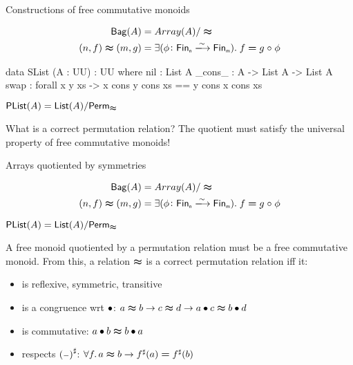 \documentclass[9pt]{beamer}
\begin{document}
\begin{frame}[fragile]{Constructions of free commutative monoids}
    \begin{dblock}
        \vspace{-0.4cm}
        \begin{align*}
            \type{Bag}(A) &= Array(A) / \reln
            \\
            (n,f) \reln (m,g) &= 
                \exis{\phi\colon \Fin[n]\xto{\sim}\Fin[m]}{f \id g \comp \phi}
        \end{align*}
    \end{dblock}
    \begin{dblock}
        \begin{code}
data SList (A : UU) : UU where
  nil : List A
  _cons_ : A -> List A -> List A
  swap : forall x y xs -> x cons y cons xs == y cons x cons xs 
        \end{code}
    \end{dblock}
    \begin{dblock}
        $\mathsf{PList}(A) = \mathsf{List}(A) / \mathsf{Perm}_{\mathrel{\boldsymbol{\approx}}}$
    \end{dblock}
    What is a correct permutation relation? The quotient must satisfy the universal property of free commutative monoids!  
\end{frame}

\begin{frame}[fragile]{Arrays quotiented by symmetries}
    \begin{dblock}
        \vspace{-0.4cm}
        \begin{align*}
            \type{Bag}(A) &= Array(A) / \reln
            \\
            (n,f) \reln (m,g) &= 
                \exis{\phi\colon \Fin[n]\xto{\sim}\Fin[m]}{f \id g \comp \phi}
        \end{align*}
    \end{dblock}
    \begin{dblock}
        $\mathsf{PList}(A) = \mathsf{List}(A) / \mathsf{Perm}_{\mathrel{\boldsymbol{\approx}}}$
    \end{dblock}

    A free monoid quotiented by a \alert{permutation relation} must be a free commutative monoid. From this, a relation $\mathrel{\boldsymbol{\approx}}$ is a correct permutation relation iff it:
    \begin{itemize}
        \item is reflexive, symmetric, transitive
        \item is a congruence wrt $\bullet$: $a \mathrel{\boldsymbol{\approx}} b \to c \mathrel{\boldsymbol{\approx}} d \to a \bullet c \mathrel{\boldsymbol{\approx}} b \bullet d$
        \item is commutative: $a \bullet b \mathrel{\boldsymbol{\approx}} b \bullet a$
        \item respects ${({\scriptstyle{-}})}^{\sharp}$: $\forall f. \, a \reln b \to \ext{f}(a) \id \ext{f}(b)$
    \end{itemize}
\end{frame}
\end{document}
